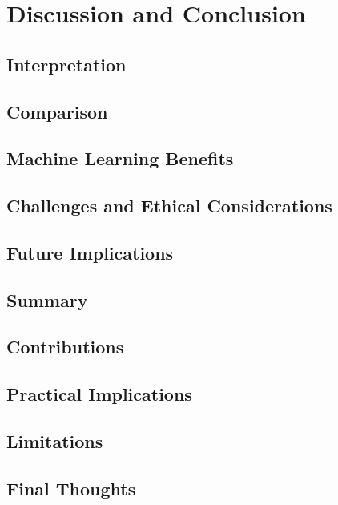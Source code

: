 \documentclass[draft,final]{thesisclass} %
\begin{document}
\chapter{Discussion and Conclusion}

\section{Interpretation}
\lipsum[1]

\section{Comparison}
\lipsum[1]

\section{Machine Learning Benefits}
\lipsum[1]

\section{Challenges and Ethical Considerations}
\lipsum[1]

\section{Future Implications}
\lipsum[1]

\section{Summary}
\lipsum[1]

\section{Contributions}
\lipsum[1]

\section{Practical Implications}
\lipsum[1]

\section{Limitations}
\lipsum[1]

\section{Final Thoughts}
\lipsum[1]
\end{document}
